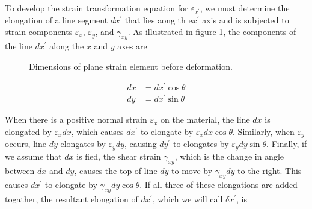 \documentclass[
10pt,
a4paper,
openany,
svgnames,
]{book} %
\begin{document}
To develop the strain transformation equation for $\varepsilon_{x^\prime }$, we must determine the elongation of a line segment $dx^\prime $ that lies aong th e$x^\prime $ axis and is subjected to strain components $\varepsilon_x$, $\varepsilon_y$, and $\gamma_{xy}$. As illustrated in figure \cref{fig: plane strain before deformation}, the components of the line $dx^\prime $ along the $x$ and $y$ axes are

\begin{figure}[h]
  \centering
  \caption{Dimensions of plane strain element before deformation.}
  \label{fig: plane strain before deformation}
\end{figure}

\begin{align*}
  dx &= dx^\prime  \cos \theta \\
  dy &= dx^\prime  \sin \theta
\end{align*}

When there is a positive normal strain $\varepsilon_x$ on the material, the line $dx$ is elongated by $\varepsilon_x dx$, which causes $dx^\prime $ to elongate by $\varepsilon_x dx \cos \theta$. Similarly, when $\varepsilon_y$ occurs, line $dy$ elongates by $\varepsilon_y dy$, causing $dy^\prime$ to elongates by $\varepsilon_y dy \sin \theta$. Finally, if we assume that $dx$ is fied, the shear strain $\gamma_{xy}$, which is the change in angle between $dx$ and $dy$, causes the top of line $dy$ to move by $\gamma_{xy} dy$ to the right. This causes $dx^\prime $ to elongate by $\gamma_{xy} dy \cos \theta$. If all three of these elongations are added togather, the resultant elongation of $dx^\prime $, which we will call $\delta x^\prime $, is
\end{document}
